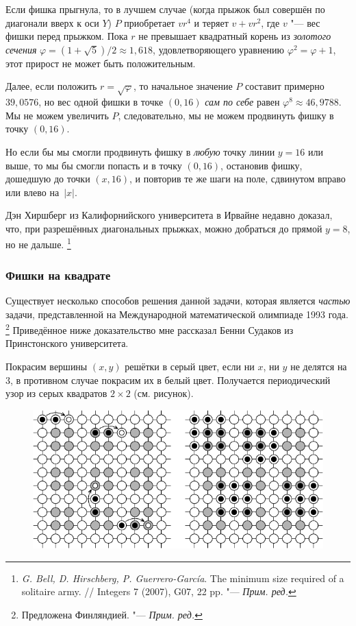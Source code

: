 \documentclass[twoside]{book}
\begin{document}
Если фишка прыгнула, то в лучшем случае (когда прыжок был совершён по диагонали вверх к оси $Y$) $P$ приобретает $vr^4$ и теряет $v+vr^2$, где $v$ "--- вес фишки перед прыжком.
Пока $r$ не превышает квадратный корень из \emph{золотого сечения} $\varphi=(1+\sqrt5)/2\approx 1{,}618$, удовлетворяющего уравнению $\varphi^2=\varphi+1$, этот прирост не может быть положительным.

Далее, если положить $r = \sqrt{\varphi}$, то начальное значение $P$ составит примерно $39{,}0576$, но вес одной фишки в точке $(0, 16)$ \emph{сам по себе} равен $\varphi^8\approx 46{,}9788$.
Мы не можем увеличить $P$, следовательно, мы не можем продвинуть фишку в точку $(0, 16)$.

Но если бы мы смогли продвинуть фишку в \emph{любую} точку линии $y = 16$ или выше, то мы бы смогли попасть и в точку $(0, 16)$, остановив фишку, дошедшую до точки $(x, 16)$, и повторив те же шаги на поле, сдвинутом вправо или влево на~$|x|$.
\heart

Дэн Хиршберг из Калифорнийского университета в Ирвайне недавно доказал, что, при разрешённых диагональных прыжках, можно добраться до прямой $y=8$, но не дальше.%
\footnote{\emph{G. Bell, D. Hirschberg, P. Guerrero-García}.
The minimum size required of a solitaire army. 
/\!/
Integers 7 (2007), G07, 22 pp. "--- \emph{Прим. ред.}}


\subsubsection*{Фишки на квадрате}%

Существует несколько способов решения данной задачи, которая является \emph{частью} задачи, представленной на Международной математической олимпиаде 1993 года.%
\footnote{Предложена Финляндией. "--- \emph{Прим. ред.}}
Приведённое ниже доказательство мне рассказал Бенни Судаков из Принстонского университета.

\medskip

Покрасим вершины $(x, y)$ решётки в серый цвет, если ни $x$, ни $y$ не делятся на $3$, в противном случае покрасим их в белый цвет.
Получается периодический узор из серых квадратов $2\times 2$ (см. рисунок). 

\begin{figure}[ht!]
  \vspace{-\baselineskip}
\centering
\includegraphics{mp/wink-190}
\end{figure}
\end{document}
